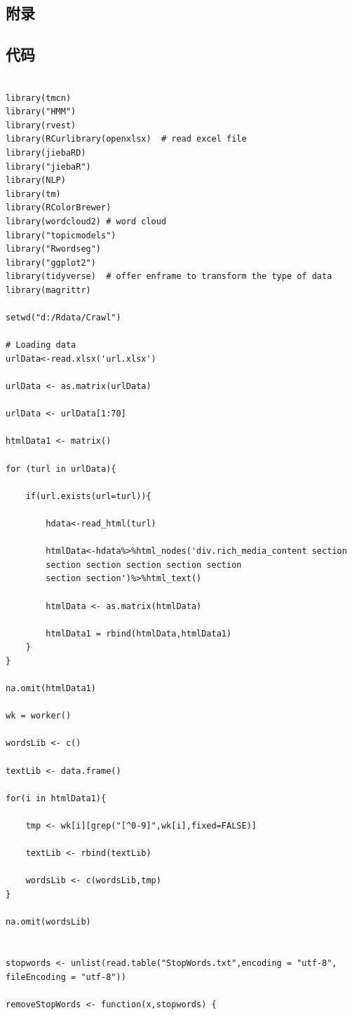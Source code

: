 \documentclass[a4paper,12pt]{ctexart}     %
\begin{document}
	
	\begin{appendix}
		
		\section{附录}
		\subsection{代码}
\begin{lstlisting}
	
library(tmcn)
library("HMM")
library(rvest)  
library(RCurlibrary(openxlsx)  # read excel file
library(jiebaRD)
library("jiebaR") 
library(NLP)
library(tm)
library(RColorBrewer)
library(wordcloud2) # word cloud
library("topicmodels")
library("Rwordseg")
library("ggplot2")
library(tidyverse)  # offer enframe to transform the type of data
library(magrittr)

setwd("d:/Rdata/Crawl")

# Loading data
urlData<-read.xlsx('url.xlsx')

urlData <- as.matrix(urlData)

urlData <- urlData[1:70]

htmlData1 <- matrix()

for (turl in urlData){
	
	if(url.exists(url=turl)){
		
		hdata<-read_html(turl) 
		
		htmlData<-hdata%>%html_nodes('div.rich_media_content section 
		section section section section section 
		section section')%>%html_text()
		
		htmlData <- as.matrix(htmlData)
		
		htmlData1 = rbind(htmlData,htmlData1)
	}
}

na.omit(htmlData1)

wk = worker()

wordsLib <- c()

textLib <- data.frame()

for(i in htmlData1){
	
	tmp <- wk[i][grep("[^0-9]",wk[i],fixed=FALSE)] 
	
	textLib <- rbind(textLib)
	
	wordsLib <- c(wordsLib,tmp)
}

na.omit(wordsLib)


stopwords <- unlist(read.table("StopWords.txt",encoding = "utf-8",
fileEncoding = "utf-8"))

removeStopWords <- function(x,stopwords) {
	

\end{lstlisting}
\end{appendix}
\end{document}
